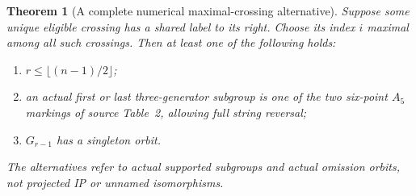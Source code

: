 \documentclass[11pt,a4paper]{article}
\newtheorem{theorem}[lemma]{Theorem}
\begin{document}
\begin{theorem}[A complete numerical maximal-crossing alternative]
\label{routing}
Suppose some unique eligible crossing has a shared label to its
right. Choose its index $i$ maximal among all such crossings.
Then at least one of the following holds:
\begin{enumerate}
\item $r\leq\lfloor(n-1)/2\rfloor$;
\item an actual first or last three-generator subgroup is one of
  the two six-point $A_5$ markings of source Table~2, allowing full
  string reversal;
\item $G_{r-1}$ has a singleton orbit.
\end{enumerate}
The alternatives refer to actual supported subgroups and actual
omission orbits, not projected IP or unnamed isomorphisms.
\end{theorem}
\end{document}
